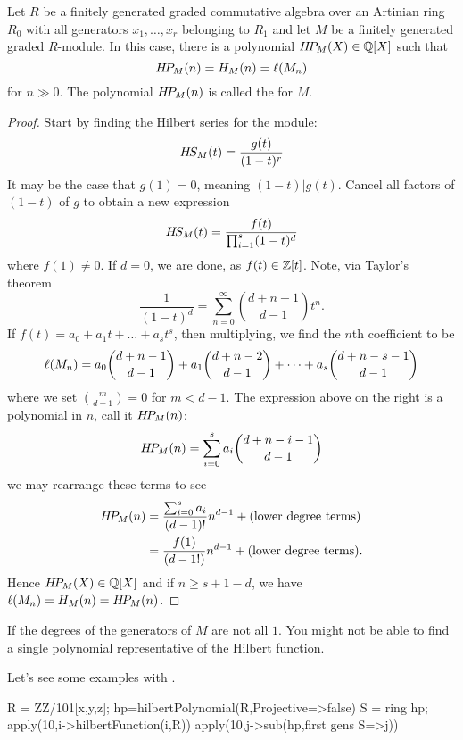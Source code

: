 \documentclass{ximera}
\begin{document}
\begin{corollary}\label{C:hp}
  Let $R$ be a finitely generated graded commutative algebra over an
  Artinian ring $R_0$ with all generators $x_1,\dots,x_r$ belonging to
  $R_1$ and let $M$ be a finitely generated graded $R$-module. In this
  case, there is a polynomial $H\!P_M(X)\in\mathbb Q[X]$ such that
  \[
  H\!P_M(n) = H_M(n) = \ell(M_n)
  \]
  for $n\gg 0$. The polynomial $H\!P_M(n)$ is called the
   for $M$.
  \begin{proof}
    Start by finding the Hilbert series for the module:
    \[
    H\!S_M(t) = \frac{g(t)}{(1-t)^r}
    \]
    It may be the case that $g(1) = 0$, meaning $(1-t)|g(t)$. Cancel
    all factors of $(1-t)$ of $g$ to obtain a new expression
    \[
    H\!S_M(t) = \frac{f(t)}{\prod_{i=1}^s(1-t)^d}
    \]
    where $f(1) \ne 0$. If $d=0$, we are done, as $f(t)\in
    \mathbb Z[t]$. Note, via Taylor's theorem
    \[
    \frac{1}{(1-t)^d} = \sum_{n=0}^\infty \binom{d+n-1}{d-1}t^n.
    \]
    If $f(t) = a_0 + a_1 t + \dots + a_s t^s$, then multiplying, we
    find the $n$th coefficient to be
    \[
    \ell(M_n) = a_0 \binom{d+n-1}{d-1} + a_1 \binom{d+n-2}{d-1} + \dots + a_s \binom{d+n-s-1}{d-1}
    \]
    where we set $\binom{m}{d-1} = 0$ for $m<d-1$. The expression
    above on the right is a polynomial in $n$, call it $H\!P_M(n)$:
    \[
    H\!P_M(n) = \sum_{i=0}^s a_i \binom{d+n-i-1}{d-1}
    \]
    we may rearrange these terms to see
    \begin{align*}
    H\!P_M(n) &= \frac{\sum_{i=0}^s a_i}{(d-1)!}n^{d-1} + (\text{lower degree terms})\\
    &= \frac{f(1)}{(d-1!)}n^{d-1}  + (\text{lower degree terms}).
    \end{align*}
    Hence $H\!P_M(X)\in \mathbb Q[X]$ and if $n\ge s+1-d$, we have $\ell(M_n) =
    H_M(n) = H\!P_M(n)$.
    \end{proof}
\end{corollary}

\begin{remark}
   If the degrees of the generators of $M$ are not all $1$. You might
   not be able to find a single polynomial representative of the
   Hilbert function.
\end{remark}

Let's see some examples with \macaulay.

\begin{macaulay2}
R = ZZ/101[x,y,z];
hp=hilbertPolynomial(R,Projective=>false)
S = ring hp;
apply(10,i->hilbertFunction(i,R))
apply(10,j->sub(hp,{first gens S=>j}))
\end{macaulay2}
\end{document}
